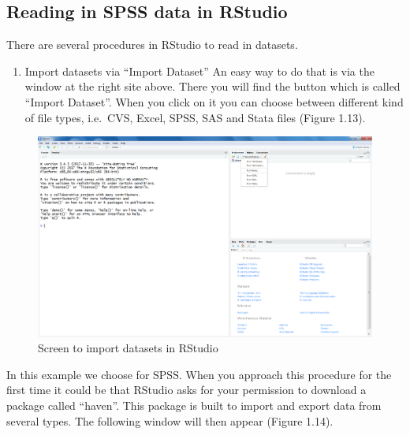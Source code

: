 \documentclass[]{book}
\providecommand{\tightlist}{%
  \setlength{\itemsep}{0pt}\setlength{\parskip}{0pt}}
\theoremstyle{definition}
\theoremstyle{definition}
\theoremstyle{definition}
\theoremstyle{remark}
\begin{document}
\subsection{Reading in SPSS data in
RStudio}\label{reading-in-spss-data-in-rstudio}

There are several procedures in RStudio to read in datasets.

\begin{enumerate}
\def\labelenumi{\arabic{enumi}.}
\tightlist
\item
  Import datasets via ``Import Dataset'' An easy way to do that is via
  the window at the right site above. There you will find the button
  which is called ``Import Dataset''. When you click on it you can
  choose between different kind of file types, i.e.~CVS, Excel, SPSS,
  SAS and Stata files (Figure 1.13).
\end{enumerate}

\begin{figure}

{\centering \includegraphics[width=0.9\linewidth]{images/fig1.13} 

}

\caption{Screen to import datasets in RStudio}\label{fig:fig13}
\end{figure}

In this example we choose for SPSS. When you approach this procedure for
the first time it could be that RStudio asks for your permission to
download a package called ``haven''. This package is built to import and
export data from several types. The following window will then appear
(Figure 1.14).
\end{document}
